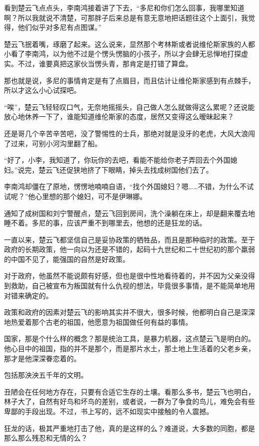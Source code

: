 看到楚云飞点点头，李南鸿接着讲了下去，“多尼和你们怎么回事，我哪里知道啊？所以我就说不清楚，可那胖子后来总是有意无意地把话题往这个上面引，我觉得，他们似乎对多尼有点图谋。”

楚云飞抿着嘴，琢磨了起来。这么说来，显然那个考林斯或者说维伦斯家族的人都小看了李南鸿，以为他不过是个愣头愣脑的小孩子，所以才会肆无忌惮地打探虚实。不过，谁要真把这家伙当愣头青，那肯定是打错了算盘。

那也就是说，多尼的事情肯定是有了点眉目，而且估计让维伦斯家感到有点棘手，所以才这么小心试探吧。

“唉”，楚云飞轻轻叹口气，无奈地摇摇头，自己做人怎么就做得这么累呢？还说能放心地休养一下了，谁能知道维伦斯家的态度，居然又变得这么暧昧起来？

还是哥几个辛苦辛苦吧，没了警惕性的士兵，那绝对就是没牙的老虎，大风大浪闯了过来，可别小河沟里翻了船。

“好了，小李，我知道了，你玩你的去吧，看能不能给你老子弄回去个外国媳妇。”说完，楚云飞还促狭地挤了下眼睛，掉头去找成树国他们去了。

李南鸿却僵在了原地，愣愣地喃喃自语，“找个外国媳妇？嗯……不错，为什么不试试呢？”他心里想的那个媳妇，可不是伊琳娜。

通知了成树国和刘宁警醒点，楚云飞回到房间，洗个澡躺在床上，却是翻来覆去地睡不着。多尼的事，应该严重不到哪里去，他想的还是狂龙的话。

一直以来，楚云飞都坚信自己是妥协政策的牺牲品，而且是那种临时的政策。至于政府的长期政策，他一向以为还是不错的，起码十九世纪和二十世纪初的那个羸弱的中国不见了，能强国的自然是好政策。

对于政府，他虽然不能说颇有好感，但也是很中性地看待着的，并不因为父亲没得到救助，自己被宣布为叛国就有什么仇视的想法，毕竟很多事情，是不能简单地用对错来确定的。

政策和政府的因素对楚云飞的影响其实并不很大，很多时候，他都明白自己是深深地热爱着那个古老的祖国，他愿意为祖国做任何有益的事情。

国家，那是个什么样的概念？那是统治工具，是暴力机器，这点楚云飞是明白的。他心目中的祖国，指的并不是那个，而是那片水土，那土地上生活着的父老乡亲，那才是他深深眷恋着的。

包括那泱泱五千年的文明。

丑陋会在任何地方存在，只要有合适它生存的土壤。看那么多书，楚云飞也明白，林子大了，自然有好鸟和坏鸟的差别，或者说，一群为了争食的鸟儿，难免会有些卑鄙的手段出现。不过，书上写的，远不如现实中接触的令人震撼。

狂龙的话，极其严重地打击了他，真的是这样的么？难道说，大多数的同胞，都是那么那么残忍和无情的么？

